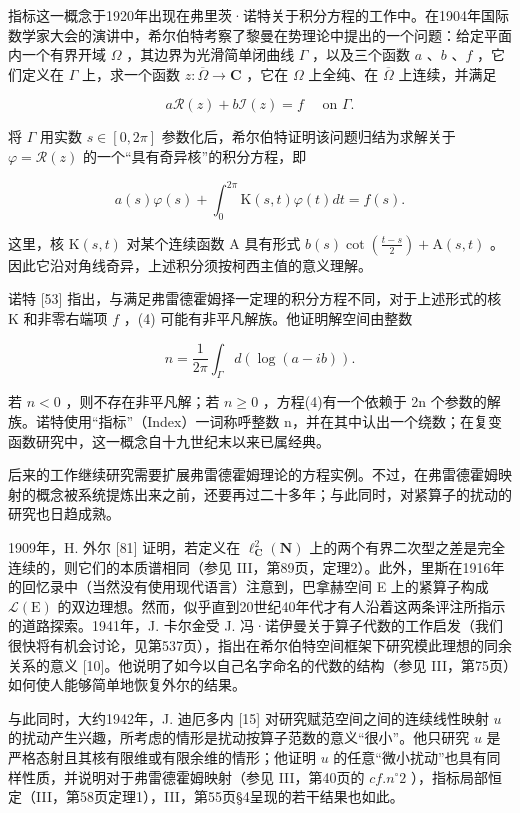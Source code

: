 
指标这一概念于1920年出现在弗里茨·诺特关于积分方程的工作中。在1904年国际数学家大会的演讲中，希尔伯特考察了黎曼在势理论中提出的一个问题：给定平面内一个有界开域 \(\Omega\) ，其边界为光滑简单闭曲线 \(\Gamma\) ，以及三个函数 \(a\) 、\(b\) 、\(f\) ，它们定义在 \(\Gamma\) 上，求一个函数 \(z: \overline{\Omega} \to \mathbf{C}\) ，它在 \(\Omega\) 上全纯、在 \(\overline{\Omega}\) 上连续，并满足

\[
a \mathcal {R} (z) + b \mathcal {I} (z) = f \quad \text { on } \Gamma .
\]

将 \(\Gamma\) 用实数 \(s \in [0, 2\pi]\) 参数化后，希尔伯特证明该问题归结为求解关于 \(\varphi = \mathcal{R}(z)\) 的一个“具有奇异核”的积分方程，即

\[
a (s) \varphi (s) + \int_ {0} ^ {2 \pi} \mathrm{K} (s, t) \varphi (t) d t = f (s).\tag{4}
\]

这里，核 \(\mathrm{K}(s, t)\) 对某个连续函数 A 具有形式 \(b(s) \cot\left(\frac{t-s}{2}\right) + \mathrm{A}(s, t)\) 。因此它沿对角线奇异，上述积分须按柯西主值的意义理解。

诺特 {[}53{]} 指出，与满足弗雷德霍姆择一定理的积分方程不同，对于上述形式的核 K 和非零右端项 \(f\) ，(4) 可能有非平凡解族。他证明解空间由整数

\[
n = \frac {1}{2 \pi} \int_ {\Gamma} d (\log (a - i b)).\tag{5}
\]

若 \(n < 0\) ，则不存在非平凡解；若 \(n \geqslant 0\) ，方程(4)有一个依赖于 2n 个参数的解族。诺特使用“指标”（Index）一词称呼整数 n，并在其中认出一个绕数；在复变函数研究中，这一概念自十九世纪末以来已属经典。

后来的工作继续研究需要扩展弗雷德霍姆理论的方程实例。不过，在弗雷德霍姆映射的概念被系统提炼出来之前，还要再过二十多年；与此同时，对紧算子的扰动的研究也日趋成熟。

1909年，H. 外尔 {[}81{]} 证明，若定义在 \(\ell_{\mathbf{C}}^{2}(\mathbf{N})\) 上的两个有界二次型之差是完全连续的，则它们的本质谱相同（参见 III，第89页，定理2）。此外，里斯在1916年的回忆录中（当然没有使用现代语言）注意到，巴拿赫空间 E 上的紧算子构成 \(\mathcal{L}(\mathrm{E})\) 的双边理想。然而，似乎直到20世纪40年代才有人沿着这两条评注所指示的道路探索。1941年，J. 卡尔金受 J. 冯·诺伊曼关于算子代数的工作启发（我们很快将有机会讨论，见第537页），指出在希尔伯特空间框架下研究模此理想的同余关系的意义 {[}10{]}。他说明了如今以自己名字命名的代数的结构（参见 III，第75页）如何使人能够简单地恢复外尔的结果。

与此同时，大约1942年，J. 迪厄多内 {[}15{]} 对研究赋范空间之间的连续线性映射 \(u\) 的扰动产生兴趣，所考虑的情形是扰动按算子范数的意义“很小”。他只研究 \(u\) 是严格态射且其核有限维或有限余维的情形；他证明 \(u\) 的任意“微小扰动”也具有同样性质，并说明对于弗雷德霍姆映射（参见 III，第40页的 \(cf. n^{\circ} 2\) ），指标局部恒定（III，第58页定理1），III，第55页§4呈现的若干结果也如此。

